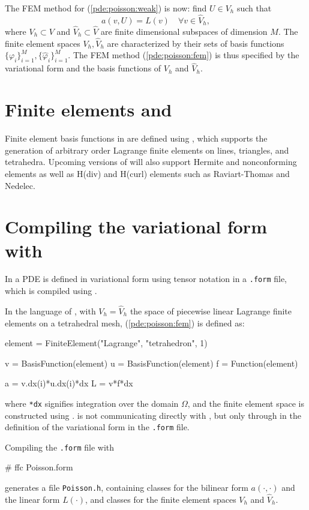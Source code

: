 The FEM method for (\ref{pde:poisson:weak}) is now: 
find $U\in V_h$ such that  
\begin{equation}\label{pde:poisson:fem}
a(v,U)=L(v) \quad \forall v\in \hat V_h, 
\end{equation}
where $V_h\subset V$ and $\hat V_h\subset \hat V$ are finite dimensional 
subspaces of dimension $M$. 
The finite element spaces $V_h,\hat V_h$ are characterized by their sets of basis 
functions $\{\varphi_i\}_{i=1}^M,\{\hat \varphi_i\}_{i=1}^M$. 
The FEM method (\ref{pde:poisson:fem}) is thus specified by the 
variational form and the basis functions of $V_h$ and $\hat V_h$. 

\section{Finite elements and \fiat{}}

Finite element basis functions in \dolfin{} are defined using \fiat{}, 
which supports the generation of arbitrary order Lagrange finite 
elements on lines, triangles, and tetrahedra. 
Upcoming versions of \fiat{} will also support Hermite and nonconforming 
elements as well as H(div) and H(curl) elements such as Raviart-Thomas and Nedelec.

\section{Compiling the variational form with \ffc{}}

In \dolfin{} a PDE is defined in variational form using tensor notation 
in a \texttt{.form} file, which is compiled using \ffc{}. 

In the language of \ffc{}, with $V_h=\hat V_h$ the space of piecewise linear Lagrange 
finite elements on a tetrahedral mesh, (\ref{pde:poisson:fem}) is defined as:  
\begin{code}
element = FiniteElement("Lagrange", "tetrahedron", 1)

v = BasisFunction(element)
u = BasisFunction(element)
f = Function(element)

a = v.dx(i)*u.dx(i)*dx
L = v*f*dx
\end{code}
where \texttt{*dx} signifies integration over the domain $\Omega$, and 
the finite element space is constructed using \fiat{}. 
\dolfin{} is not communicating directly with \fiat{}, but only through 
\ffc{} in the definition of the variational form in the \texttt{.form} file.  

Compiling the \texttt{.form} file with 
\begin{code}
# ffc Poisson.form
\end{code}
generates a file \texttt{Poisson.h}, containing classes for 
the bilinear form $a(\cdot,\cdot)$ and the linear form $L(\cdot)$, 
and classes for the finite element spaces $V_h$ and $\hat V_h$. 

